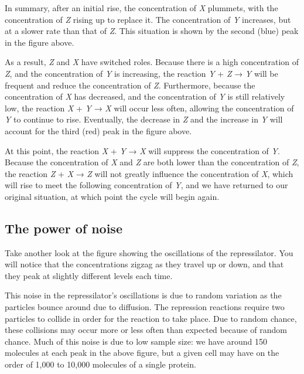 In summary, after an initial rise, the concentration of \textit{X} plummets, with the concentration of \textit{Z} rising up to replace it. The concentration of \textit{Y} increases, but at a slower rate than that of \textit{Z}. This situation is shown by the second (blue) peak in the figure above.

As a result, \textit{Z} and \textit{X} have switched roles. Because there is a high concentration of \textit{Z}, and the concentration of \textit{Y} is increasing, the reaction \textit{Y} + \textit{Z} → \textit{Y} will be frequent and reduce the concentration of \textit{Z}. Furthermore, because the concentration of \textit{X} has decreased, and the concentration of \textit{Y} is still relatively low, the reaction \textit{X} + \textit{Y} → \textit{X} will occur less often, allowing the concentration of \textit{Y} to continue to rise. Eventually, the decrease in \textit{Z} and the increase in \textit{Y} will account for the third (red) peak in the figure above.

At this point, the reaction \textit{X} + \textit{Y} → \textit{X} will suppress the concentration of \textit{Y}. Because the concentration of \textit{X} and \textit{Z} are both lower than the concentration of \textit{Z}, the reaction \textit{Z} + \textit{X} → \textit{Z} will not greatly influence the concentration of \textit{X}, which will rise to meet the following concentration of \textit{Y}, and we have returned to our original situation, at which point the cycle will begin again.

\FloatBarrier
{}
\subsection{The power of noise}

Take another look at the figure showing the oscillations of the repressilator. You will notice that the concentrations zigzag as they travel up or down, and that they peak at slightly different levels each time.

This noise in the repressilator's oscillations is due to random variation as the particles bounce around due to diffusion. The repression reactions require two particles to collide in order for the reaction to take place. Due to random chance, these collisions may occur more or less often than expected because of random chance. Much of this noise is due to low sample size: we have around 150 molecules at each peak in the above figure, but a given cell may have on the order of 1,000 to 10,000 molecules of a single protein.

